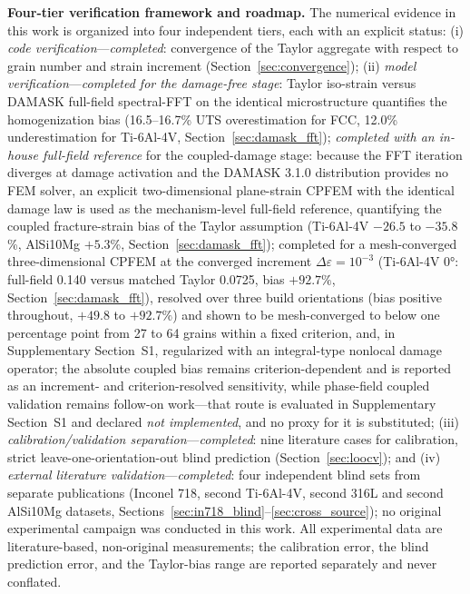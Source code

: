 \documentclass[twocolumn]{sagej}
\begin{document}
\textbf{Four-tier verification framework and roadmap.} The numerical evidence in this work is organized into four independent tiers, each with an explicit status: (i) \emph{code verification}---\emph{completed}: convergence of the Taylor aggregate with respect to grain number and strain increment (Section~\ref{sec:convergence}); (ii) \emph{model verification}---\emph{completed for the damage-free stage}: Taylor iso-strain versus DAMASK full-field spectral-FFT on the identical microstructure quantifies the homogenization bias (16.5--16.7\% UTS overestimation for FCC, 12.0\% underestimation for Ti-6Al-4V, Section~\ref{sec:damask_fft}); \emph{completed with an in-house full-field reference} for the coupled-damage stage: because the FFT iteration diverges at damage activation and the DAMASK 3.1.0 distribution provides no FEM solver, an explicit two-dimensional plane-strain CPFEM with the identical damage law is used as the mechanism-level full-field reference, quantifying the coupled fracture-strain bias of the Taylor assumption (Ti-6Al-4V $-26.5$ to $-35.8$\%, AlSi10Mg $+5.3$\%, Section~\ref{sec:damask_fft}); completed for a mesh-converged three-dimensional CPFEM at the converged increment $\Delta\varepsilon=10^{-3}$ (Ti-6Al-4V $\ang{0}$: full-field 0.140 versus matched Taylor 0.0725, bias $+92.7\%$, Section~\ref{sec:damask_fft}), resolved over three build orientations (bias positive throughout, $+49.8$ to $+92.7\%$) and shown to be mesh-converged to below one percentage point from 27 to 64 grains within a fixed criterion, and, in Supplementary Section~S1, regularized with an integral-type nonlocal damage operator; the absolute coupled bias remains criterion-dependent and is reported as an increment- and criterion-resolved sensitivity, while phase-field coupled validation remains follow-on work---that route is evaluated in Supplementary Section~S1 and declared \emph{not implemented}, and no proxy for it is substituted; (iii) \emph{calibration/validation separation}---\emph{completed}: nine literature cases for calibration, strict leave-one-orientation-out blind prediction (Section~\ref{sec:loocv}); and (iv) \emph{external literature validation}---\emph{completed}: four independent blind sets from separate publications (Inconel 718, second Ti-6Al-4V, second 316L and second AlSi10Mg datasets, Sections~\ref{sec:in718_blind}--\ref{sec:cross_source}); no original experimental campaign was conducted in this work. All experimental data are literature-based, non-original measurements; the calibration error, the blind prediction error, and the Taylor-bias range are reported separately and never conflated.
\end{document}
